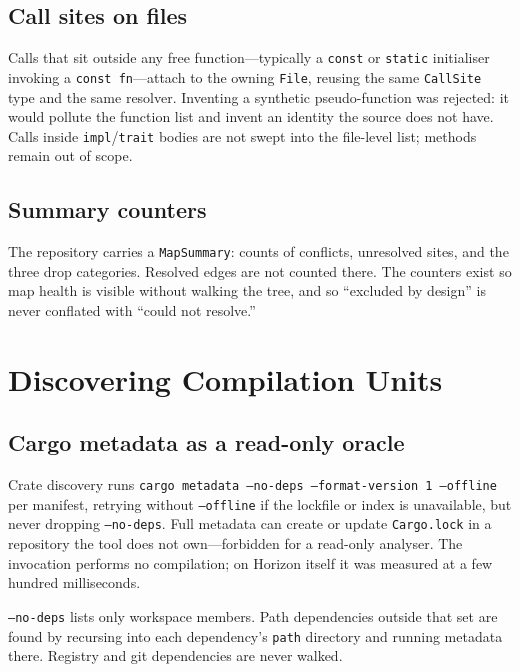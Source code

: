 \documentclass[11pt,a4paper,oneside]{report}
\newcommand{\horizon}{Horizon}
\begin{document}
\section{Call sites on files}

Calls that sit outside any free function---typically a \texttt{const} or
\texttt{static} initialiser invoking a \texttt{const fn}---attach to the
owning \texttt{File}, reusing the same \texttt{CallSite} type and the same
resolver. Inventing a synthetic pseudo-function was rejected: it would pollute
the function list and invent an identity the source does not have. Calls
inside \texttt{impl}/\texttt{trait} bodies are not swept into the file-level
list; methods remain out of scope.

\section{Summary counters}

The repository carries a \texttt{MapSummary}: counts of conflicts, unresolved
sites, and the three drop categories. Resolved edges are not counted there.
The counters exist so map health is visible without walking the tree, and so
``excluded by design'' is never conflated with ``could not resolve.''

\chapter{Discovering Compilation Units}
\label{ch:discover}

\section{Cargo metadata as a read-only oracle}

Crate discovery runs
\texttt{cargo metadata --no-deps --format-version 1 --offline} per manifest,
retrying without \texttt{--offline} if the lockfile or index is unavailable,
but never dropping \texttt{--no-deps}. Full metadata can create or update
\texttt{Cargo.lock} in a repository the tool does not own---forbidden for a
read-only analyser. The invocation performs no compilation; on \horizon{}
itself it was measured at a few hundred milliseconds.

\texttt{--no-deps} lists only workspace members. Path dependencies outside
that set are found by recursing into each dependency's \texttt{path}
directory and running metadata there. Registry and git dependencies are never
walked.
\end{document}
